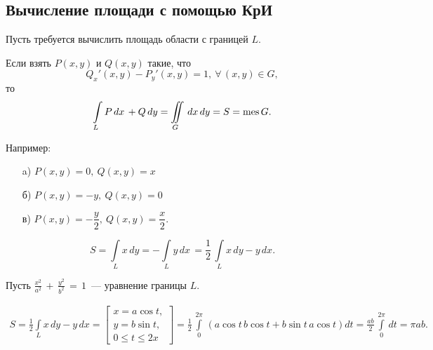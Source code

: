 \documentclass[../../main.tex]{subfiles}
\begin{document}
\subsection{Вычисление площади с помощью КрИ}

Пусть требуется вычислить площадь области с границей $L$. 

Если взять $P(x, y)$ и $Q(x, y)$ такие, что
\[
Q_x'(x, y) - P_y'(x, y) = 1,\ \forall\, (x, y) \in G,
\]
то
\[
\int\limits_{L} P\, dx\, + Q\, dy = \iint\limits_{G}\, dx\, dy
= S = \operatorname{mes} G.
\]

Например:
	\begin{itemize}
		\item[a)] $ P(x, y) = 0,\ Q(x, y) = x $
		\item[б)] $ P(x, y) = -y,\ Q(x, y) = 0 $
		\item[в)] $ P(x, y) = -\dfrac{y}{2},\ Q(x, y) = \dfrac{x}{2}.$
	\end{itemize}

\[
S = \int\limits_{L} x\, dy =
- \int\limits_{L} y\, dx\, =
\frac{1}{2}\, \int\limits_{L} x\, dy - y\, dx.
\]

\begin{example}
	Пусть $\displaystyle
	\frac{x^2}{a^2}\, +\, \frac{y^2}{b^2}\, =\, 1$~--- уравнение границы $L$.
	
	\[
	\begin{gathered}
		S = \frac{1}{2}\int\limits_{L} x\, dy - y\, dx = 
		\left[
			\begin{gathered}
				x = a \cos t, \\
				y = b \sin t, \\
				0 \leq t \leq 2x
			\end{gathered}
		\right] =
		\frac{1}{2}\, \int\limits_{0}^{2\pi}\, \left( a \cos t\, b \cos t +
		b \sin t\, a \cos t \right) dt 
		= \frac{ab}{2}\, \int\limits_{0}^{2\pi}\, dt =
		\pi ab.
	\end{gathered}
	\]
\end{example}
\end{document}
